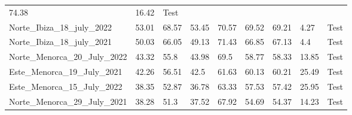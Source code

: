 \begin{table}[H]
{\begin{tabular}{lllllllll}
            74.38
                                                   & 16.42               &
            {\color[HTML]{fc8d62} Test}
            \\
            Norte\_Ibiza\_18\_july\_2022           & 53.01               &
            68.57
                                                   & 53.45               &
            70.57
                                                   & 69.52               &
            69.21
                                                   & 4.27                &
            {\color[HTML]{fc8d62} Test}
            \\
            Norte\_Ibiza\_18\_july\_2021           & 50.03               &
            66.05
                                                   & 49.13               &
            71.43
                                                   & 66.85               &
            67.13
                                                   & 4.4                 &
            {\color[HTML]{fc8d62} Test}
            \\
            Norte\_Menorca\_20\_July\_2022         & 43.32               & 55.8
                                                   & 43.98               & 69.5
                                                   & 58.77               &
            58.33
                                                   & 13.85               &
            {\color[HTML]{fc8d62} Test}
            \\
            Este\_Menorca\_19\_July\_2021          & 42.26               &
            56.51
                                                   & 42.5                &
            61.63
                                                   & 60.13               &
            60.21
                                                   & 25.49               &
            {\color[HTML]{fc8d62} Test}
            \\
            Este\_Menorca\_15\_July\_2022          & 38.35               &
            52.87
                                                   & 36.78               &
            63.33
                                                   & 57.53               &
            57.42
                                                   & 25.95               &
            {\color[HTML]{fc8d62} Test}
            \\
            Norte\_Menorca\_29\_July\_2021         & 38.28               & 51.3
                                                   & 37.52               &
            67.92
                                                   & 54.69               &
            54.37
                                                   & 14.23               &
            {\color[HTML]{fc8d62} Test}
            \\ \bottomrule
        \end{tabular}%
    }
\end{table}


